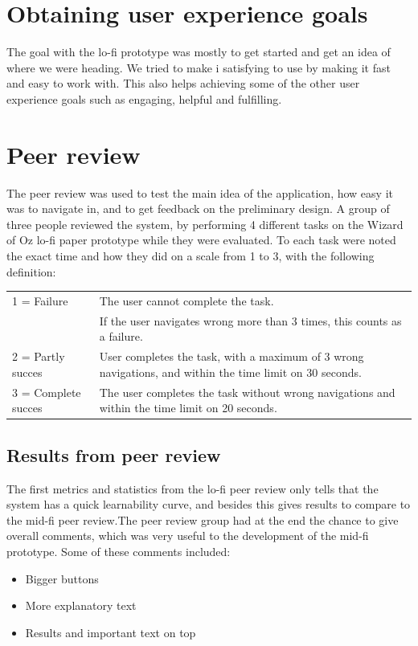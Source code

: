 \section{Obtaining user experience goals}
The goal with the lo-fi prototype was mostly to get started and get an idea of where we were heading. We tried to make i satisfying to use by making it fast and easy to work with. This also helps achieving some of the other user experience goals such as engaging, helpful and fulfilling.\\



\section{Peer review}
The peer review was used to test the main idea of the application, how easy it was to navigate in, and to get feedback on the preliminary design. A group of three people reviewed the system, by performing 4 different tasks on the Wizard of Oz lo-fi paper prototype while they were evaluated. To each task were noted the exact time and how they did on a scale from 1 to 3, with the following definition:
\begin{table}[H]
    \begin{tabular}{|p{4cm} p{10cm}|}
    \hline
    1 = Failure         & The user cannot complete the task. \\
    ~ & If the user navigates wrong more than 3 times, this counts as a failure. \\ \hline
    2 = Partly succes   & User completes the task, with a maximum of 3 wrong navigations, and within the time limit on 30 seconds.    \\ \hline
    3 = Complete succes & The user completes the task without wrong navigations and within the time limit on 20 seconds.              \\ \hline
    \end{tabular}
\end{table}

\subsection{Results from peer review}
The first metrics and statistics from the lo-fi peer review only tells that the system has a quick learnability curve, and besides this gives results to compare to the mid-fi peer review.The peer review group had at the end the chance to give overall comments, which was very useful to the development of the mid-fi prototype. 
Some of these comments included:\\
\begin{itemize}
\item Bigger buttons
\item More explanatory text
\item Results and important text on top
\end{itemize}

